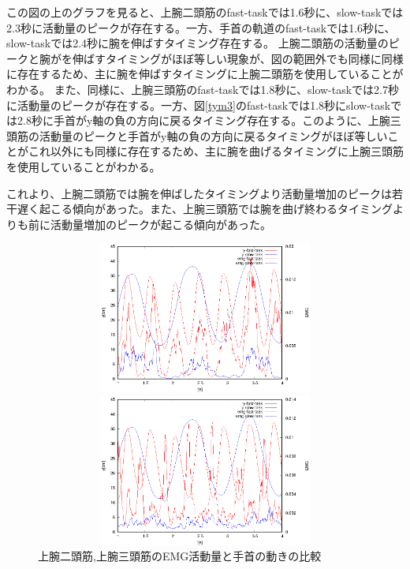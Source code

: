 \documentclass{jsarticle}
\begin{document}
この図の上のグラフを見ると、上腕二頭筋のfast-taskでは1.6秒に、slow-taskでは2.3秒に活動量のピークが存在する。一方、手首の軌道のfast-taskでは1.6秒に、slow-taskでは2.4秒に腕を伸ばすタイミング存在する。
上腕二頭筋の活動量のピークと腕がを伸ばすタイミングがほぼ等しい現象が、図の範囲外でも同様に同様に存在するため、主に腕を伸ばすタイミングに上腕二頭筋を使用していることがわかる。
また、同様に、上腕三頭筋のfast-taskでは1.8秒に、slow-taskでは2.7秒に活動量のピークが存在する。一方、図\ref{tym3}のfast-taskでは1.8秒にslow-taskでは2.8秒に手首がy軸の負の方向に戻るタイミング存在する。このように、上腕三頭筋の活動量のピークと手首がy軸の負の方向に戻るタイミングがほぼ等しいことがこれ以外にも同様に存在するため、主に腕を曲げるタイミングに上腕三頭筋を使用していることがわかる。



これより、上腕二頭筋では腕を伸ばしたタイミングより活動量増加のピークは若干遅く起こる傾向があった。また、上腕三頭筋では腕を曲げ終わるタイミングよりも前に活動量増加のピークが起こる傾向があった。


\begin{figure}[htb]
  \begin{center}
    \includegraphics[width=17cm,height=5cm]{hikakudata1.eps}

    \includegraphics[width=17cm,height=5cm]{hikakudata2.eps}
    \caption{上腕二頭筋,上腕三頭筋のEMG活動量と手首の動きの比較}
    \label{hikaku2}
  \end{center}
\end{figure}
\end{document}
